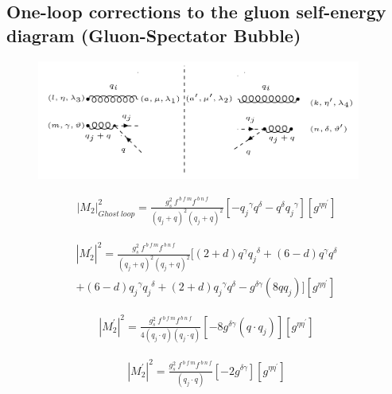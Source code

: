 \pagebreak
\subsection{One-loop corrections to the gluon self-energy diagram (Gluon-Spectator Bubble)}
\begin{figure}[h!]
\centering
\includegraphics[width=0.95\textwidth]{images/GG/GhostM2.png}
\end{figure}
\begin{equation}
\begin{split}
{{|M_2|}^2_{Ghost \:loop}}=\frac{g_s^2 \:f^{\:b\:f\:m} f^{\:b\:n\:f}}{(q_j +q)^2 (q_j +q)^2} [-{q_j}^{{\gamma}}{q}^{{\delta}}-{q}^{{\delta}}{q_j}^{{\gamma}}][g^{{\eta}{{\eta}^{\prime}}}]
\end{split}
\end{equation}

\begin{equation}
\begin{split}
{|{M}^{\prime}_2|}^2 =\frac{g_s^2\: f^{\:b\:f\:m} f^{\:b\:n\:f}}{(q_j +q)^2 (q_j +q)^2}[(2+d)q^{\gamma}{q_j}^{\delta}+(6-d)q^{\gamma}{q}^{\delta}\\+(6-d){q_j}^{\gamma}{q_j}^{\delta}+(2+d){q_j}^{\gamma}{q}^{\delta}-g^{{\delta}{\gamma}}(8qq_j)][g^{{\eta}{{\eta}^{\prime}}}]
\end{split}
\end{equation}

\begin{equation}
\begin{split}
{|{M}^{\prime}_2|}^2 =\frac{g_s^2\: f^{\:b\:f\:m} f^{\:b\:n\:f}}{4(q_j \cdot q) (q_j \cdot q)}[-8g^{{\delta}{\gamma}}(q \cdot q_j)][g^{{\eta}{{\eta}^{\prime}}}]
\end{split}
\end{equation}

\begin{equation}
\begin{split}
{|{M}^{\prime}_2|}^2 =\frac{g_s^2\: f^{\:b\:f\:m} f^{\:b\:n\:f}}{(q_j \cdot q)}[-2g^{{\delta}{\gamma}}][g^{{\eta}{{\eta}^{\prime}}}]
\end{split}
\end{equation}

